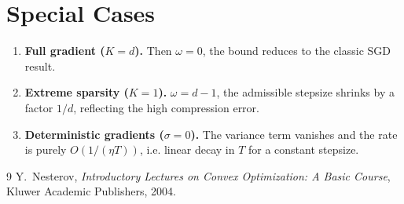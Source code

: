 \documentclass{article}
\begin{document}
\section*{Special Cases}
\begin{enumerate}[leftmargin=*,labelsep=5mm]
\item \textbf{Full gradient ($K=d$).} Then $\omega=0$, the bound reduces to the classic SGD result.
\item \textbf{Extreme sparsity ($K=1$).} $\omega=d-1$, the admissible stepsize shrinks by a factor $1/d$, reflecting the high compression error.
\item \textbf{Deterministic gradients ($\sigma=0$).} The variance term vanishes and the rate is purely $O(1/(\eta T))$, i.e. linear decay in $T$ for a constant stepsize.
\end{enumerate}

\begin{thebibliography}{9}
Y.~Nesterov, \emph{Introductory Lectures on Convex Optimization: A Basic Course}, Kluwer Academic Publishers, 2004.
\end{thebibliography}
\end{document}
